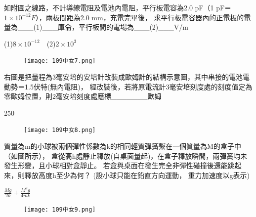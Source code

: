 \documentclass[cn,10pt,math=newtx]{elegantbook}
\begin{document}
\begin{example}
  如附圖之線路，不計導線電阻及電池內電阻，平行板電容為2.0 pF（1 pF＝$1\times 10^{-12}F$），兩板間距為2.0 mm，充電完畢後，
  求平行板電容器內的正電板的電量為\_\_\_(1)\_\_\_庫侖，平行板間的電場為\_\_\_(2)\_\_\_V/m\\
  \rightline{[台中女中教甄109]}
\end{example}
\begin{solution}
  (1)$8\times 10^{-12}$\ \ (2)$2\times 10^3$
\end{solution}
\begin{figure}[htbp]
  \flushright
  \texttt{[image: 109中女7.png]}
\end{figure}
\newpage
\begin{example}
  右圖是把量程為3毫安培的安培計改裝成歐姆計的結構示意圖，其中串接的電池電動勢＝1.5伏特(無內電阻)，
  經改裝後，若將原電流計3毫安培刻度處的刻度值定為零歐姆位置，則2毫安培刻度處應標\_\_\_\_\_\_\_歐姆\\
  \rightline{[台中女中教甄109]} 
\end{example}
\begin{solution}
  250
\end{solution}
\begin{figure}[htbp]
  \flushright
  \texttt{[image: 109中女8.png]}
\end{figure}
\newpage
\begin{example}
  質量為m的小球被兩個彈性係數為k的相同輕質彈簧繫在一個質量為M的盒子中（如圖所示），
  盒從高h處靜止釋放(自桌面量起)，在盒子釋放瞬間，兩彈簧均未發生形變，且小球相對盒靜止。
  若盒與桌面在發生完全非彈性碰撞後還能跳起來，則釋放高度h至少為何？
  (設小球只能在鉛直方向運動， 重力加速度以g表示)\\ 
  \rightline{[台中女中教甄109]} 
\end{example}
\begin{solution}
  $\frac{Mg}{2k}+\frac{M^2 g}{4mk}$
\end{solution}
\begin{figure}[htbp]
  \flushright
  \texttt{[image: 109中女9.png]}
\end{figure}
\newpage
\end{document}
